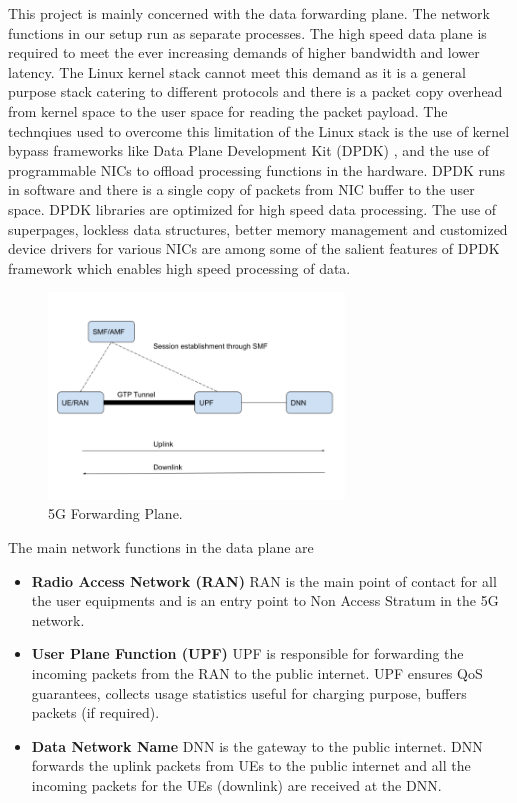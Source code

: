 This project is mainly concerned with the data forwarding plane. The network functions in our setup run as separate processes.
The high speed data plane is required to meet the ever increasing demands of higher bandwidth and lower latency. The Linux kernel stack cannot meet this demand as it is a general purpose stack catering to different protocols and there is a packet copy overhead from kernel space to the user space for reading the packet payload. The technqiues used to overcome this limitation of the Linux stack is the use of kernel bypass frameworks like Data Plane Development Kit (DPDK) \cite{dpdk}, and the use of programmable NICs to offload processing functions in the hardware. 
DPDK runs in software and there is a single copy of packets from NIC buffer to the
 user space. DPDK libraries are optimized for high speed data processing. The use
  of superpages, lockless data structures, better memory management and customized device drivers for
   various NICs are among some of the salient features of DPDK framework which
   enables high speed processing of data. 
\begin{figure}[htbp]
	\centering
       \includegraphics[width=0.7\textwidth]{fig/5Goverview.png}
       \setlength{\belowcaptionskip}{-12pt}
	\caption{5G Forwarding Plane.}
	\label{fig:5gForwardingPlane}
       \end{figure}



   The main network functions in the data plane are 
   \begin{itemize}
	   \item \textbf{Radio Access Network (RAN)} RAN is the main point of contact for all the user equipments and is an entry point to Non Access Stratum in the 5G network.
	   \item \textbf{User Plane Function (UPF)}
	   UPF is responsible for forwarding the incoming packets from the RAN to the public internet. UPF ensures QoS guarantees, collects usage statistics useful for charging purpose, buffers packets (if required).
	   
	   \item \textbf{Data Network Name}
	   DNN is the gateway to the public internet. DNN forwards the uplink packets from UEs to the public internet and all the incoming packets for the UEs (downlink) are received at the DNN.
   \end{itemize}
  
